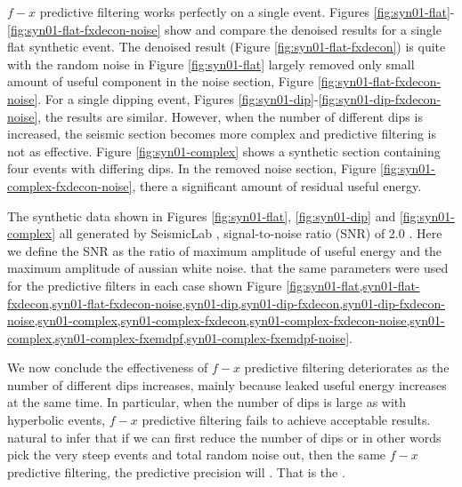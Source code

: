$f-x$ predictive filtering works perfectly on a single event. Figures  \ref{fig:syn01-flat}-\ref{fig:syn01-flat-fxdecon-noise} show and compare the denoised results for a single flat synthetic event. The denoised result (Figure \ref{fig:syn01-flat-fxdecon}) is quite \wen{,} with the random noise in Figure \ref{fig:syn01-flat} largely removed   only  small amount of  useful component in the noise section, Figure \ref{fig:syn01-flat-fxdecon-noise}.  For a single dipping event, Figures \ref{fig:syn01-dip}-\ref{fig:syn01-dip-fxdecon-noise}, the results are similar. However, when the number of different dips is increased, the seismic section becomes more complex and predictive filtering is not as effective. Figure \ref{fig:syn01-complex} shows a synthetic section containing four events with differing dips. In the removed noise section, Figure \ref{fig:syn01-complex-fxdecon-noise}, there  a significant amount of residual useful energy. 

The synthetic data shown in Figures \ref{fig:syn01-flat}, \ref{fig:syn01-dip}\wen{,} and \ref{fig:syn01-complex}  all generated by SeismicLab ,  signal-to-noise ratio (SNR) of  2.0 . Here we define the SNR as the ratio of maximum amplitude of useful energy and the maximum amplitude of aussian white noise.  that the same parameters were used for the predictive filters in each case shown  Figure \ref{fig:syn01-flat,syn01-flat-fxdecon,syn01-flat-fxdecon-noise,syn01-dip,syn01-dip-fxdecon,syn01-dip-fxdecon-noise,syn01-complex,syn01-complex-fxdecon,syn01-complex-fxdecon-noise,syn01-complex,syn01-complex-fxemdpf,syn01-complex-fxemdpf-noise}.

We now conclude  the effectiveness of $f-x$ predictive filtering deteriorates as the number of different dips increases, mainly because  leaked useful energy increases at the same time. In particular, when the number of dips is  large\wen{,} as  with hyperbolic events, $f-x$ predictive filtering fails to achieve acceptable results.  natural to infer that if we can first reduce the number of dips\wen{,} or in other words pick the very steep events and total random noise out\dlo{ }, then   the same $f-x$ predictive filtering, the predictive precision will . That is  the  .

